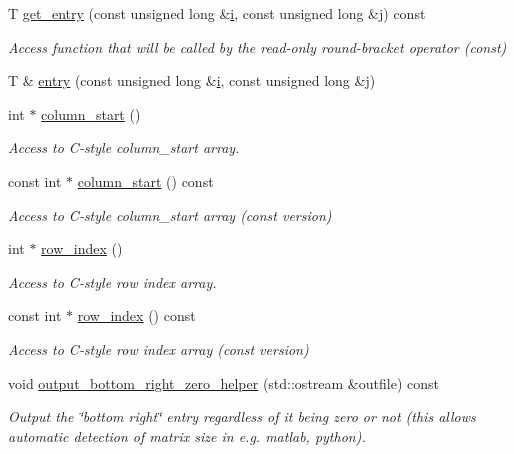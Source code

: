 \begin{DoxyCompactItemize}
T \hyperlink{classoomph_1_1CCMatrix_a9b40b8a395a94be77939308cc413828a}{get\+\_\+entry} (const unsigned long \&\hyperlink{cfortran_8h_adb50e893b86b3e55e751a42eab3cba82}{i}, const unsigned long \&j) const
\begin{DoxyCompactList}\small\item\em Access function that will be called by the read-\/only round-\/bracket operator (const) \end{DoxyCompactList}\item 
T \& \hyperlink{classoomph_1_1CCMatrix_a93b26c3364bd4994f547998b7ceb939c}{entry} (const unsigned long \&\hyperlink{cfortran_8h_adb50e893b86b3e55e751a42eab3cba82}{i}, const unsigned long \&j)
\item 
int $\ast$ \hyperlink{classoomph_1_1CCMatrix_a955390de47c08eb8799550519a1a2751}{column\+\_\+start} ()
\begin{DoxyCompactList}\small\item\em Access to C-\/style column\+\_\+start array. \end{DoxyCompactList}\item 
const int $\ast$ \hyperlink{classoomph_1_1CCMatrix_a972a8849d0df2ae0908a9a091e471aca}{column\+\_\+start} () const
\begin{DoxyCompactList}\small\item\em Access to C-\/style column\+\_\+start array (const version) \end{DoxyCompactList}\item 
int $\ast$ \hyperlink{classoomph_1_1CCMatrix_acbea54ff48550342267246b7ae07c8c4}{row\+\_\+index} ()
\begin{DoxyCompactList}\small\item\em Access to C-\/style row index array. \end{DoxyCompactList}\item 
const int $\ast$ \hyperlink{classoomph_1_1CCMatrix_aabe4e5f26a8581821f3c5458aeca7c50}{row\+\_\+index} () const
\begin{DoxyCompactList}\small\item\em Access to C-\/style row index array (const version) \end{DoxyCompactList}\item 
void \hyperlink{classoomph_1_1CCMatrix_ac3b138b2ed470866999f2a92f3e1f239}{output\+\_\+bottom\+\_\+right\+\_\+zero\+\_\+helper} (std\+::ostream \&outfile) const
\begin{DoxyCompactList}\small\item\em Output the \char`\"{}bottom right\char`\"{} entry regardless of it being zero or not (this allows automatic detection of matrix size in e.\+g. matlab, python). \end{DoxyCompactList}\item 

\end{DoxyCompactItemize}
